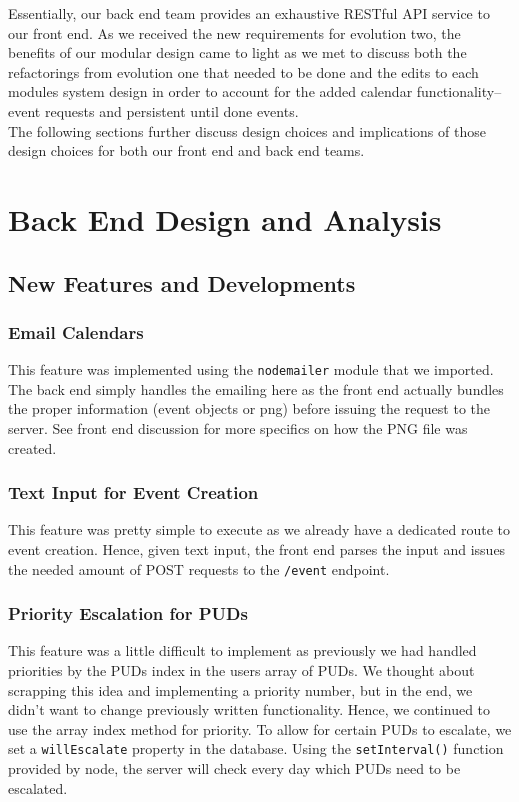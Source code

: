 \documentclass[11pt]{article}   %
\begin{document}
\noindent Essentially, our back end team provides an exhaustive RESTful API service to our front end. As we received the new requirements for evolution two, the benefits of our modular design came to light as we met to discuss both the refactorings from evolution one that needed to be done and the edits to each modules system design in order to account for the added calendar functionality--event requests and persistent until done events.\\

\noindent The following sections further discuss design choices and implications of those design choices for both our front end and back end teams. \\

\section{Back End Design and Analysis}
\subsection{New Features and Developments}
\subsubsection*{Email Calendars}
This feature was implemented using the \texttt{nodemailer} module that we imported. The back end simply handles the emailing here as the front end actually bundles the proper information (event objects or png) before issuing the request to the server. See front end discussion for more specifics on how the PNG file was created. 
\subsubsection*{Text Input for Event Creation}
This feature was pretty simple to execute as we already have a dedicated route to event creation. Hence, given text input, the front end parses the input and issues the needed amount of POST requests to the \texttt{/event} endpoint.
\subsubsection*{Priority Escalation for PUDs}
This feature was a little difficult to implement as previously we had handled priorities by the PUDs index in the users array of PUDs. We thought about scrapping this idea and implementing a priority number, but in the end, we didn't want to change previously written functionality. Hence, we continued to use the array index method for priority. To allow for certain PUDs to escalate, we set a \texttt{willEscalate} property in the database. Using the \texttt{setInterval()} function provided by node, the server will check every day which PUDs need to be escalated.
\end{document}

